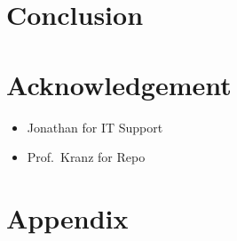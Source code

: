 \documentclass[
]{article}
\providecommand{\tightlist}{%
  \setlength{\itemsep}{0pt}\setlength{\parskip}{0pt}}\usepackage{longtable,booktabs,array}
\begin{document}
\section{Conclusion}\label{conclusion}

\section{Acknowledgement}\label{acknowledgement}

\begin{itemize}
\tightlist
\item
  Jonathan for IT Support
\item
  Prof.~Kranz for Repo
\end{itemize}

\section*{Appendix}\label{appendix}
\end{document}
